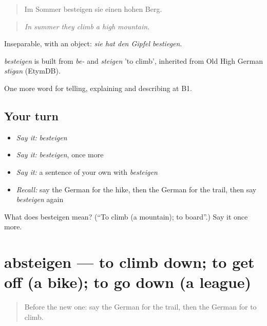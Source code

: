 \begin{quote}
Im Sommer besteigen sie einen hohen Berg.
\end{quote}

\begin{quote}
\emph{In summer they climb a high mountain.}
\end{quote}

Inseparable, with an object: \emph{sie hat den Gipfel bestiegen}.

\begin{cousinweb}
\emph{besteigen} is built from \emph{be-} and \emph{steigen} 'to climb', inherited from Old High German \emph{stīgan} (EtymDB).
\end{cousinweb}

\begin{grammarlens}[title={What you've built}]
One more word for telling, explaining and describing at B1.
\end{grammarlens}

\subsection*{Your turn}
\begin{itemize}
\raggedright
  \item \emph{Say it:} \emph{besteigen}
  \item \emph{Say it:} \emph{besteigen}, once more
  \item \emph{Say it:} a sentence of your own with \emph{besteigen}
  \item \emph{Recall:} say the German for the hike, then the German for the trail, then say \emph{besteigen} again
\end{itemize}

\begin{tcolorbox}[breakable,colback=teal!4,colframe=teal!35!black,title={Before you move on}]
What does besteigen mean? (\textquotedblleft{}To climb (a mountain); to board\textquotedblright{}.) Say it once more.
\end{tcolorbox}
\section[absteigen]{absteigen — to climb down; to get off (a bike); to go down (a league)}

\label{lesson:GE-C454-absteigen}



\begin{quote}
Before the new one: say the German for the trail, then the German for to climb.
\end{quote}

